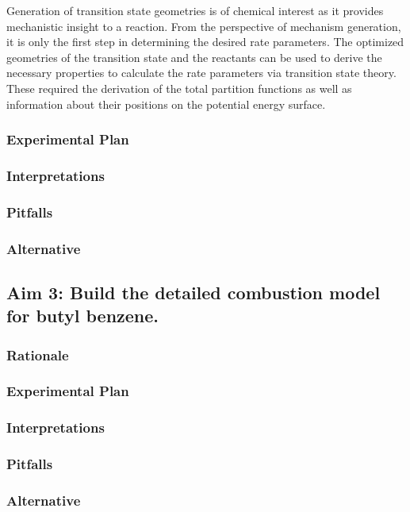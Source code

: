 \documentclass[12pt]{article}
\begin{document}
Generation of transition state geometries is of chemical interest as it provides mechanistic insight to a reaction. From the perspective of mechanism generation, it is only the first step in determining the desired rate parameters. The optimized geometries of the transition state and the reactants can be used to derive the necessary properties to calculate the rate parameters via transition state theory. These required the derivation of the total partition functions as well as information about their positions on the potential energy surface.

\subsubsection{Experimental Plan}
\subsubsection{Interpretations}
\subsubsection{Pitfalls}
\subsubsection{Alternative}

\subsection{Aim 3: Build the detailed combustion model for butyl benzene.}



\subsubsection{Rationale}
\subsubsection{Experimental Plan}
\subsubsection{Interpretations}
\subsubsection{Pitfalls}
\subsubsection{Alternative}
\end{document}
